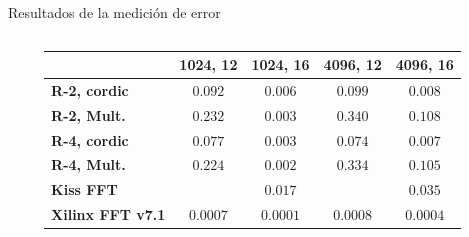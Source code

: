 \begin{frame}{Resultados de la medición de error}

  \begin{columns}[T]
    \begin{column}{.2\textwidth}

    \end{column}
    \begin{column}{.8\textwidth}
	\begin{tabular}{l c c c c}
		& \textbf{1024, 12} & \textbf{1024, 16} & \textbf{4096, 12} & \textbf{4096, 16}\\ \hline 
		\textbf{R-2, cordic} & $0.092$ & $0.006$ & $0.099$ & $0.008 $\\
		\textbf{R-2, Mult.} & $0.232$ & $0.003$ & $0.340$ & $0.108$\\
		\textbf{R-4, cordic} & $0.077$ & $0.003$ & $0.074$ & $0.007$\\
		\textbf{R-4, Mult.} & $0.224$ & $0.002$ & $0.334$ & $0.105$\\
		\textbf{Kiss FFT} & $ $ & $0.017$ & $ $ & $0.035$\\
		\textbf{Xilinx FFT v7.1} & $0.0007$ & $0.0001$ & $0.0008$ & $0.0004$\\ \hline
	\end{tabular}\\
	\end{column}
	
	\begin{column}{.2\textwidth}
	
	\end{column}

  \end{columns}
	

\end{frame}

